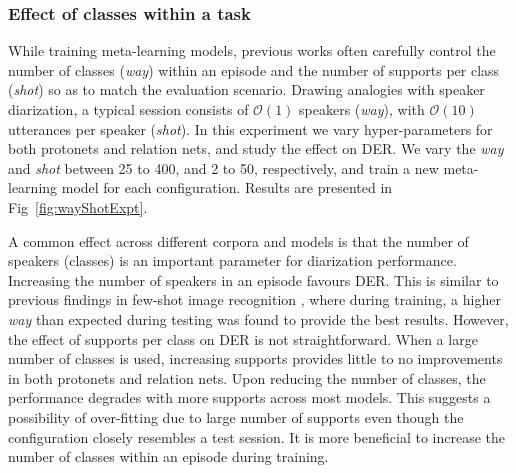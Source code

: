\subsubsection{Effect of classes within a task}

While training meta-learning models, previous works \cite{snell2017prototypical, sung2018learning, vinyals2016matching} often carefully control the number of classes (\textit{way}) within an episode and the number of supports per class (\textit{shot}) so as to match the evaluation scenario. 
Drawing analogies with speaker diarization, a typical session consists of $\mathcal{O}(1)$ speakers (\textit{way}), with $\mathcal{O}(10)$ utterances per speaker (\textit{shot}). In this experiment we vary hyper-parameters for both protonets and relation nets, and study the effect on DER. We vary the \textit{way} and \textit{shot} between 25 to 400, and 2 to 50, respectively, and train a new meta-learning model for each configuration. Results are presented in Fig~\ref{fig:wayShotExpt}. 

A common effect across different corpora and models is that the number of speakers (classes) is an important parameter for diarization performance. Increasing the number of speakers in an episode favours DER. This is similar to previous findings in few-shot image recognition \cite{snell2017prototypical}, where during training, a higher \textit{way} than expected during testing was found to provide the best results. However, the effect of supports per class on DER is not straightforward. When a large number of classes is used, increasing supports provides little to no improvements in both protonets and relation nets. Upon reducing the number of classes, the performance degrades with more supports across most models. This suggests a possibility of over-fitting due to large number of supports even though the configuration closely resembles a test session. It is more beneficial to increase the number of classes within an episode during training.


